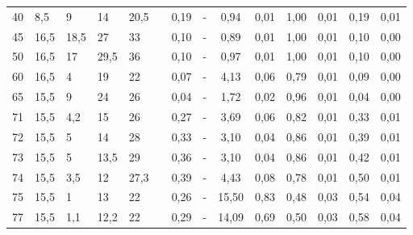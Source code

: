 \documentclass[a4paper,12pt]{report}
\begin{document}
\begin{table}[H]
\begin{center}
\begin{tabular}{|p{0.8cm}|p{0.6cm}|p{0.6cm}|p{0.6cm}|p{0.6cm}|c|c|c|c|c|c|c|c|c|}
40    & 8,5     & 9       & 14      & 20,5    &                        & 0,19  & -        & 0,94  & 0,01        & 1,00         & 0,01               & 0,19         & 0,01               \\ \cline{1-5} \cline{7-14} 
45    & 16,5    & 18,5    & 27      & 33      &                        & 0,10  & -        & 0,89  & 0,01        & 1,00         & 0,01               & 0,10         & 0,00               \\ \cline{1-5} \cline{7-14} 
50    & 16,5    & 17      & 29,5    & 36      &                        & 0,10  & -        & 0,97  & 0,01        & 1,00         & 0,01               & 0,10         & 0,00               \\ \cline{1-5} \cline{7-14} 
60    & 16,5    & 4       & 19      & 22      &                        & 0,07  & -        & 4,13  & 0,06        & 0,79         & 0,01               & 0,09         & 0,00               \\ \cline{1-5} \cline{7-14} 
65    & 15,5    & 9       & 24      & 26      &                        & 0,04  & -        & 1,72  & 0,02        & 0,96         & 0,01               & 0,04         & 0,00               \\ \cline{1-5} \cline{7-14} 
71    & 15,5    & 4,2     & 15      & 26      &                        & 0,27  & -        & 3,69  & 0,06        & 0,82         & 0,01               & 0,33         & 0,01               \\ \cline{1-5} \cline{7-14} 
72    & 15,5    & 5       & 14      & 28      &                        & 0,33  & -        & 3,10  & 0,04        & 0,86         & 0,01               & 0,39         & 0,01               \\ \cline{1-5} \cline{7-14} 
73    & 15,5    & 5       & 13,5    & 29      &                        & 0,36  & -        & 3,10  & 0,04        & 0,86         & 0,01               & 0,42         & 0,01               \\ \cline{1-5} \cline{7-14} 
74    & 15,5    & 3,5     & 12      & 27,3    &                        & 0,39  & -        & 4,43  & 0,08        & 0,78         & 0,01               & 0,50         & 0,01               \\ \cline{1-5} \cline{7-14} 
75    & 15,5    & 1       & 13      & 22      &                        & 0,26  & -        & 15,50 & 0,83        & 0,48         & 0,03               & 0,54         & 0,04               \\ \cline{1-5} \cline{7-14} 
77    & 15,5    & 1,1     & 12,2    & 22      &                        & 0,29  & -        & 14,09 & 0,69        & 0,50         & 0,03               & 0,58         & 0,04               \\ \cline{1-5} \cline{7-14} 

\end{tabular}
\end{center}
\end{table}
\end{document}
